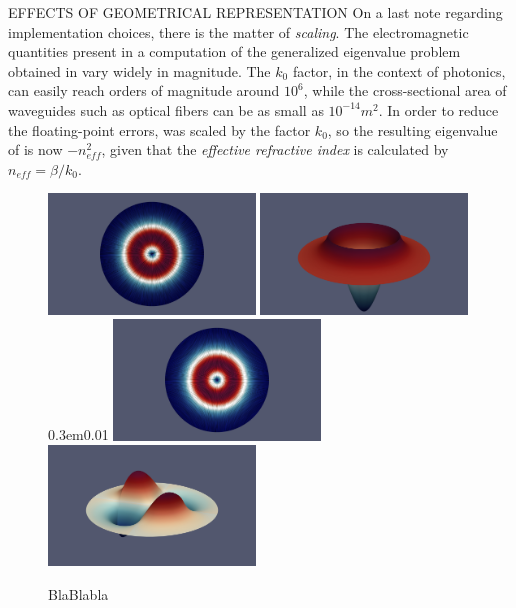 \documentclass[final]{beamer} %
\def\vspace{0.3em}{ }%
\begin{document}
\begin{frame}
\begin{columns}
\begin{column}{0.45\textwidth}
{\begin{block}{\boxnumber EFFECTS OF GEOMETRICAL REPRESENTATION}
        On a last note regarding implementation choices, there is the matter of \emph{scaling}. The electromagnetic quantities present in a computation of the generalized eigenvalue problem obtained in  vary widely in magnitude. The $k_0$ factor, in the context of photonics, can easily reach orders of magnitude around $10^6$, while the cross-sectional area of waveguides such as optical fibers can be as small as $10^{-14}m^2$. In order to reduce the floating-point errors,  was scaled by the factor $k_0$, so the resulting eigenvalue of  is now $-n_{eff}^2$, given that the \emph{effective refractive index} is calculated by $n_{eff} = \beta/k_0$.
        \begin{figure}[hb]
            \includegraphics[width=0.49\textwidth]{images/et2.png}%
            \hspace{0.01\textwidth}%
            \includegraphics[width=0.49\textwidth]{images/ez2.png}
            \vspace{0.01\textwidth}
            \includegraphics[width=0.49\textwidth]{images/et3.png}%
            \hspace{0.01\textwidth}%
            \includegraphics[width=0.49\textwidth]{images/ez3.png}
            \caption{BlaBlabla}
        \end{figure}
        \end{block}

}
\end{column}
\end{columns}
\end{frame}
\end{document}
